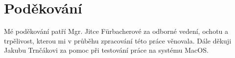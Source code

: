 \section*{Poděkování}

Mé poděkování patří Mgr. Jitce Fürbacherové za odborné vedení, ochotu a trpělivost, kterou mi v průběhu zpracování této práce věnovala. Dále děkuji Jakubu Trnčákovi za pomoc při testování práce na systému MacOS.

\thispagestyle{empty}
\pagebreak
